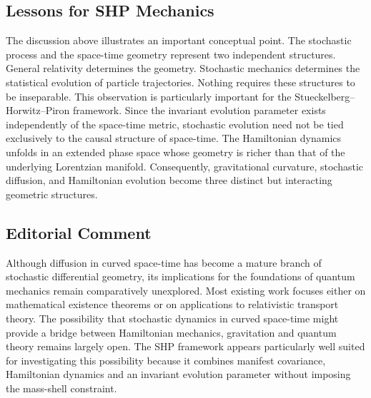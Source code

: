 \subsection{Lessons for SHP Mechanics}
The discussion above illustrates an important conceptual point.
The stochastic process and the space-time geometry represent two
independent structures.
General relativity determines the geometry.
Stochastic mechanics determines the statistical evolution of particle
trajectories.
Nothing requires these structures to be inseparable.
This observation is particularly important for the
Stueckelberg--Horwitz--Piron framework.
Since the invariant evolution parameter exists independently of the
space-time metric, stochastic evolution need not be tied exclusively to
the causal structure of space-time.
The Hamiltonian dynamics unfolds in an extended phase space whose
geometry is richer than that of the underlying Lorentzian manifold.
Consequently, gravitational curvature, stochastic diffusion, and
Hamiltonian evolution become three distinct but interacting geometric
structures.
\subsection*{Editorial Comment}
Although diffusion in curved space-time has become a mature branch of
stochastic differential geometry, its implications for the foundations
of quantum mechanics remain comparatively unexplored.
Most existing work focuses either on mathematical existence theorems or
on applications to relativistic transport theory.
The possibility that stochastic dynamics in curved space-time might
provide a bridge between Hamiltonian mechanics, gravitation and quantum
theory remains largely open.
The SHP framework appears particularly well suited for investigating
this possibility because it combines manifest covariance, Hamiltonian
dynamics and an invariant evolution parameter without imposing the
mass-shell constraint.
